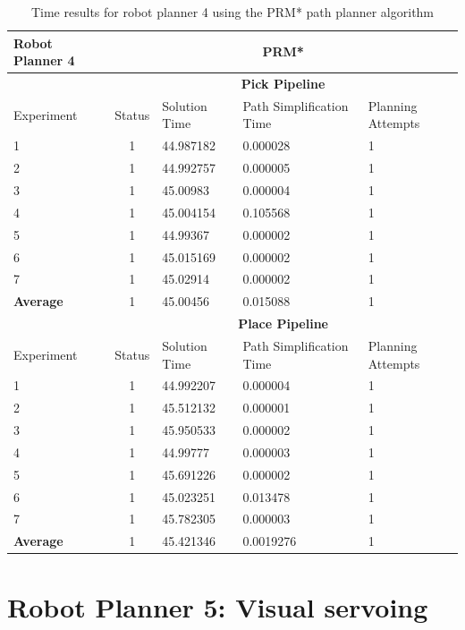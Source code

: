 \begin{table}[H]
\centering
\begin{tabular}{|p{2cm}|c|p{3cm}|p{3cm}|p{3cm}|}
\hline
Robot Planner 4           & \multicolumn{4}{c}{\textbf{PRM*}}                                                                                                 \vline \\
\hline
                          & \multicolumn{4}{c}{\textbf{Pick Pipeline}}                     \vline \\
\hline
Experiment                & Status & Solution Time & Path Simplification Time & Planning Attempts  \\
\hline
1	& 1	& 44.987182	& 0.000028	& 1 \\
2	& 1	& 44.992757	& 0.000005	& 1 \\
3	& 1	& 45.00983	& 0.000004	& 1 \\
4	& 1	& 45.004154	& 0.105568	& 1 \\
5	& 1	& 44.99367	& 0.000002	& 1 \\
6	& 1	& 45.015169	& 0.000002	& 1 \\
7	& 1	& 45.02914	& 0.000002	& 1 \\
\hline
\textbf{Average} & 1	& 45.00456	& 0.015088	& 1 \\
\hline
                          & \multicolumn{4}{c}{\textbf{Place Pipeline}}                     \vline \\
\hline
Experiment                & Status & Solution Time & Path Simplification Time & Planning Attempts  \\
\hline
1	& 1	& 44.992207	& 0.000004	& 1 \\
2	& 1	& 45.512132	& 0.000001	& 1 \\
3	& 1	& 45.950533	& 0.000002	& 1 \\
4	& 1	& 44.99777	& 0.000003	& 1 \\
5	& 1	& 45.691226	& 0.000002	& 1 \\
6	& 1	& 45.023251	& 0.013478	& 1 \\
7	& 1	& 45.782305	& 0.000003	& 1 \\
\hline
\textbf{Average}	& 1	& 45.421346	& 0.0019276	& 1 \\
\hline
\end{tabular}
\caption{Time results for robot planner 4 using the PRM* path planner algorithm}
\label{robot-planner4-prmstar-data}
\end{table}


\section{Robot Planner 5: Visual servoing}

